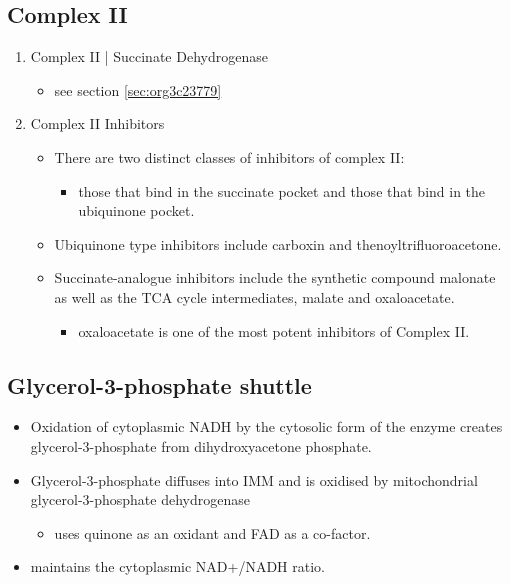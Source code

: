 \documentclass{scrartcl}
\begin{document}
\subsection{Complex II}
\label{sec:orgddfe745}
\begin{enumerate}
\item Complex II | Succinate Dehydrogenase
\label{sec:org4ffa2b1}
\begin{itemize}
\item see section \ref{sec:org3c23779}
\end{itemize}

\item Complex II Inhibitors
\label{sec:org2d2f042}
\begin{itemize}
\item There are two distinct classes of inhibitors of complex II:
\begin{itemize}
\item those that bind in the succinate pocket and those that bind in the ubiquinone pocket.
\end{itemize}
\item Ubiquinone type inhibitors include carboxin and thenoyltrifluoroacetone.
\item Succinate-analogue inhibitors include the synthetic compound malonate as well as the TCA cycle intermediates, malate and oxaloacetate.
\begin{itemize}
\item oxaloacetate is one of the most potent inhibitors of Complex II.
\end{itemize}
\end{itemize}
\end{enumerate}

\subsection{Glycerol-3-phosphate shuttle}
\label{sec:orgdaa404c}
\begin{itemize}
\item Oxidation of cytoplasmic NADH by the cytosolic form of the enzyme
creates glycerol-3-phosphate from dihydroxyacetone phosphate.
\item Glycerol-3-phosphate diffuses into IMM and is oxidised by mitochondrial glycerol-3-phosphate dehydrogenase
\begin{itemize}
\item uses quinone as an oxidant and FAD as a co-factor.
\end{itemize}
\item maintains the cytoplasmic NAD+/NADH ratio.
\end{itemize}
\end{document}
